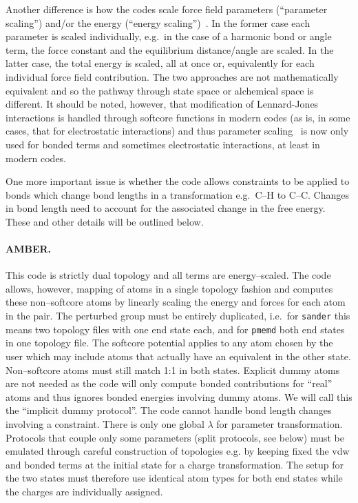 \documentclass[journal=jctcce,manuscript=article]{achemso}
\newcommand{\progname}[1]{\texttt{#1}}
\begin{document}
Another difference is how the codes scale force field parameters (``parameter 
scaling'') and/or the energy (``energy 
scaling'')~\cite{doi:10.1021/jp981628n}.  In the former case each parameter is 
scaled individually, e.g.\ in the case of a harmonic bond or angle term,
the force constant and the equilibrium distance/angle are scaled. In the 
latter case, the total energy is scaled, all at once or, equivalently for each 
individual force field contribution.  The two approaches are not mathematically 
equivalent and so the pathway through state space or alchemical space 
is different.  It should be noted, however, that modification of Lennard-Jones 
interactions is handled through softcore functions in modern codes (as is, in 
some cases, that for electrostatic interactions) and thus parameter 
scaling~\cite{doi:10.1021/j100056a020, JCROSS1986198} is now only used for 
bonded terms and sometimes electrostatic interactions, at least in modern codes.

One more important issue is whether the code allows constraints to be applied 
to bonds which change bond lengths in a transformation e.g.\ C--H to C--C.  
Changes in bond length need to account for the associated change in the free 
energy.  These and other details will be outlined below.

\paragraph{AMBER.}
This code is strictly dual topology and all terms are energy--scaled.  The code 
allows, however, mapping of atoms in a single topology fashion and computes 
these non--softcore atoms  by linearly scaling the energy and forces for each 
atom in the pair.  The perturbed group must be entirely duplicated, i.e.\ for 
\progname{sander} this means two topology files with one end state each, and 
for \progname{pmemd} both end states in one topology file.  The softcore 
potential applies to any atom chosen by the user which may include atoms that 
actually have an equivalent in the other state.  Non--softcore atoms must still 
match 1:1 in both states.  Explicit dummy atoms are not needed as the code will 
only compute bonded contributions for ``real'' atoms and thus ignores bonded 
energies involving dummy atoms.  We will call this the ``implicit dummy 
protocol''. The code cannot handle bond length changes involving a constraint.  
There is only one global $\lambda$ for parameter transformation.  Protocols 
that couple only some parameters (split protocols, see below) must be emulated 
through careful construction of topologies e.g. by keeping fixed the vdw and 
bonded terms at the initial state for a charge transformation.  The setup for 
the two states must therefore use identical atom types for both end states 
while the charges are individually assigned.
\end{document}

